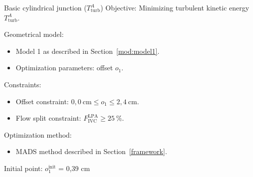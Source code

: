 

\begin{optimproblem}{Basic cylindrical junction ($T^{A}_{\mathrm{turb}}$)}
	\vspace{2mm}
	Objective: Minimizing turbulent kinetic energy $T^{A}_{\mathrm{turb}}$.
	
	\vspace{2mm}
	Geometrical model:
	\begin{itemize}
		\item Model 1 as described in Section~\ref{mod:model1}.
		\item Optimization parameters: offset $o_1$.
	\end{itemize}
	Constraints:
	\begin{itemize}
		\item Offset constraint: $0{,}0~\text{cm} \leq o_1 \leq 2{,}4~\text{cm}$.
		\item Flow split constraint: $F^{\text{LPA}}_{\text{IVC}} \geq 25~\%$.
	\end{itemize}
	Optimization method:
	\begin{itemize}
		\item MADS method described in Section~\ref{framework}.
	\end{itemize}
	Initial point: $o^{\text{init}}_{1}$ = 0{,}39 cm
	\label{optimprob:4}
\end{optimproblem}
\vspace{-5mm}

